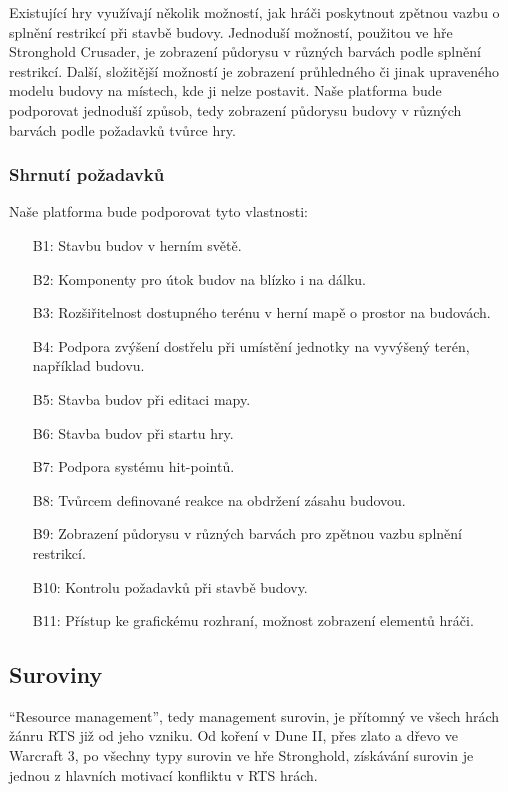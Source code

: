 Existující hry využívají několik možností, jak hráči poskytnout zpětnou vazbu o splnění restrikcí při stavbě budovy. Jednoduší možností, použitou ve hře Stronghold Crusader, je zobrazení půdorysu v různých barvách podle splnění restrikcí. Další, složitější možností je zobrazení průhledného či jinak upraveného modelu budovy na místech, kde ji nelze postavit.  Naše platforma bude podporovat jednoduší způsob, tedy zobrazení půdorysu budovy v různých barvách podle požadavků tvůrce hry.

\subsubsection{Shrnutí požadavků}

Naše platforma bude podporovat tyto vlastnosti:
\begin{itemize}
	\item[B1:] Stavbu budov v herním světě.
	\item[B2:] Komponenty pro útok budov na blízko i na dálku.
	\item[B3:] Rozšiřitelnost dostupného terénu v herní mapě o prostor na budovách.
	\item[B4:] Podpora zvýšení dostřelu při umístění jednotky na vyvýšený terén, například budovu.
	\item[B5:] Stavba budov při editaci mapy.
	\item[B6:] Stavba budov při startu hry.
	\item[B7:] Podpora systému hit-pointů.
	\item[B8:] Tvůrcem definované reakce na obdržení zásahu budovou.
	\item[B9:] Zobrazení půdorysu v různých barvách pro zpětnou vazbu splnění restrikcí.
	\item[B10:] Kontrolu požadavků při stavbě budovy.
	\item[B11:] Přístup ke grafickému rozhraní, možnost zobrazení elementů hráči.
\end{itemize}


\subsection{Suroviny}
\label{sec:suroviny}
``Resource management'', tedy management surovin, je přítomný ve všech hrách žánru RTS již od jeho vzniku. Od koření v Dune II, přes zlato a dřevo ve Warcraft 3, po všechny typy surovin ve hře Stronghold, získávání surovin je jednou z hlavních motivací konfliktu v RTS hrách. 

